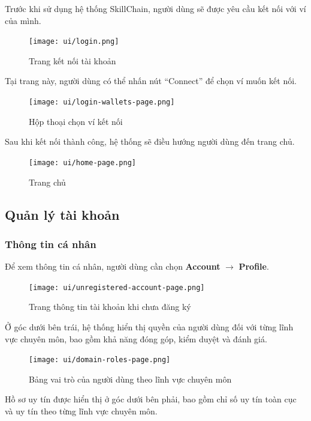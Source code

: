 Trước khi sử dụng hệ thống SkillChain, người dùng sẽ được yêu cầu kết nối với ví của mình.

\begin{figure}[H]
  \centering
  \texttt{[image: ui/login.png]}
  \caption{Trang kết nối tài khoản}
  \label{fig:login-page}
\end{figure}

Tại trang này, người dùng có thể nhấn nút ``Connect'' để chọn ví muốn kết nối.

\begin{figure}[H]
  \centering
  \texttt{[image: ui/login-wallets-page.png]}
  \caption{Hộp thoại chọn ví kết nối}
  \label{fig:login-wallets-page}
\end{figure}

Sau khi kết nối thành công, hệ thống sẽ điều hướng người dùng đến trang chủ.

\begin{figure}[H]
  \centering
  \texttt{[image: ui/home-page.png]}
  \caption{Trang chủ}
  \label{fig:home-page}
\end{figure}

\subsection{Quản lý tài khoản}

\subsubsection{Thông tin cá nhân}

Để xem thông tin cá nhân, người dùng cần chọn \textbf{Account} $\rightarrow$ \textbf{Profile}.

\begin{figure}[H]
  \centering
  \texttt{[image: ui/unregistered-account-page.png]}
  \caption{Trang thông tin tài khoản khi chưa đăng ký}
  \label{fig:unregistered-account-page}
\end{figure}

Ở góc dưới bên trái, hệ thống hiển thị quyền của người dùng đối với từng lĩnh vực chuyên môn, bao gồm khả năng đóng góp, kiểm duyệt và đánh giá.

\begin{figure}[H]
  \centering
  \texttt{[image: ui/domain-roles-page.png]}
  \caption{Bảng vai trò của người dùng theo lĩnh vực chuyên môn}
  \label{fig:domain-roles-page}
\end{figure}

Hồ sơ uy tín được hiển thị ở góc dưới bên phải, bao gồm chỉ số uy tín toàn cục và uy tín theo từng lĩnh vực chuyên môn.

